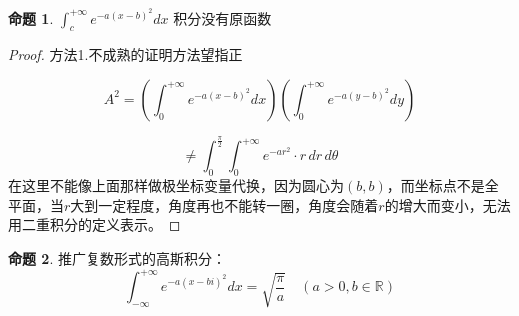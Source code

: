 \documentclass[12pt,a4paper]{article}
\numberwithin{subsection}{section}   %
\numberwithin{subsubsection}{subsection}
\theoremstyle{plain}
\theoremstyle{definition}
\newtheorem{example}{命题}[subsection]  %
\theoremstyle{remark}
\theoremstyle{remark}
\begin{document}
	\begin{example}
		\label{ex:2}
		$	\int_{c}^{+\infty} e^{-a(x-b)^2} dx$
		积分没有原函数
	\end{example}
	
	\begin{proof}
		
		
		方法1.不成熟的证明方法望指正
		
		
		
		
		
		\begin{equation*}
			A^2 = \left( \int_{0}^{+\infty} e^{-a(x-b)^2} dx \right) \left( \int_{0}^{+\infty} e^{-a(y-b)^2} dy \right)
		\end{equation*}
		
		\begin{equation*}
			\neq \int_{0}^{\frac{\pi}{2}} \int_{0}^{+\infty} e^{-ar^2} \cdot r \, dr \, d\theta
		\end{equation*}
		在这里不能像上面那样做极坐标变量代换，因为圆心为$(b,b)$，而坐标点不是全平面，当$r$大到一定程度，角度再也不能转一圈，角度会随着$r$的增大而变小，无法用二重积分的定义表示。
		
		
	\end{proof}
	
	
	\begin{example}
		\label{ex:2}
		推广复数形式的高斯积分：
		\begin{equation}
			\int_{-\infty}^{+\infty} e^{-a(x-bi)^2} dx = \sqrt{\frac{\pi}{a}} \quad (a>0, b \in \mathbb{R})
		\end{equation}
	\end{example}
	
\end{document}
